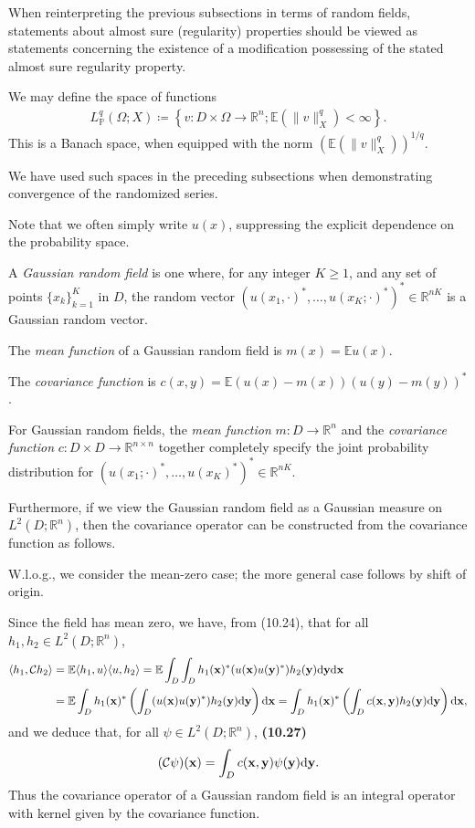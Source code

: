\documentclass[oneside,11pt]{book}
\numberwithin{equation}{section}
\begin{document}
When reinterpreting the previous subsections in terms of random fields, statements about almost sure (regularity) properties should be viewed as statements concerning the existence of a modification possessing of the stated almost sure regularity property.

%
We may define the space of functions
\begin{align*}
    L_{\mathbb{P}}^q(\Omega;X)\coloneqq\left\{v:D\times\Omega\to\mathbb{R}^n;\mathbb{E}(\|v\|_X^q) < \infty\right\}.
\end{align*}
This is a Banach space, when equipped with the norm $(\mathbb{E}(\|v\|_X^q))^{1/q}$.

We have used such spaces in the preceding subsections when demonstrating convergence of the randomized series.

Note that we often simply write $u(x)$, suppressing the explicit dependence on the probability space.

%
A \textit{Gaussian random field} is one where, for any integer $K\ge 1$, and any set of points $\{x_k\}_{k=1}^K$ in $D$, the random vector $(u(x_1,\cdot)^*,\ldots,u(x_K;\cdot)^*)^*\in\mathbb{R}^{nK}$ is a Gaussian random vector.

The \textit{mean function} of a Gaussian random field is $m(x) = \mathbb{E}u(x)$.

The \textit{covariance function} is $c(x,y) = \mathbb{E}(u(x) - m(x))(u(y) - m(y))^*$.

For Gaussian random fields, the \textit{mean function} $m:D\to\mathbb{R}^n$ and the \textit{covariance function} $c:D\times D\to\mathbb{R}^{n\times n}$ together completely specify the joint probability distribution for $(u(x_1;\cdot)^*,\ldots,u(x_K)^*)^*\in\mathbb{R}^{nK}$.

Furthermore, if we view the Gaussian random field as a Gaussian measure on $L^2(D;\mathbb{R}^n)$, then the covariance operator can be constructed from the covariance function as follows.

W.l.o.g., we consider the mean-zero case; the more general case follows by shift of origin.

Since the field has mean zero, we have, from (10.24), that for all $h_1,h_2\in L^2(D;\mathbb{R}^n)$,
\begin{align*}
    \langle h_1,\mathcal{C}h_2\rangle &= \mathbb{E}\langle h_1,u\rangle\langle u,h_2\rangle = \mathbb{E}\int_D\int_D h_1({\bf x})^*(u({\bf x})u({\bf y})^*)h_2({\bf y}){\rm d}{\bf y}{\rm d}{\bf x}\\
    &= \mathbb{E}\int_D h_1({\bf x})^*\left(\int_D (u({\bf x})u({\bf y})^*)h_2({\bf y}){\rm d}{\bf y}\right){\rm d}{\bf x} = \int_D h_1({\bf x})^*\left(\int_D c({\bf x},{\bf y})h_2({\bf y}){\rm d}{\bf y}\right){\rm d}{\bf x},
\end{align*}
and we deduce that, for all $\psi\in L^2(D;\mathbb{R}^n)$, \textbf{(10.27)}
\begin{align*}
    (\mathcal{C}\psi)({\bf x}) = \int_D c({\bf x},{\bf y})\psi({\bf y}){\rm d}{\bf y}.
\end{align*}
Thus the covariance operator of a Gaussian random field is an integral operator with kernel given by the covariance function.
\end{document}
